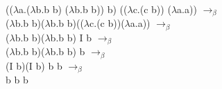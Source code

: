 \documentclass[12pt]{article}
\begin{document}
    (($\lambda$a.($\lambda$b.b b) ($\lambda$b.b b)) b) (($\lambda$c.(c b)) ($\lambda$a.a)) $\rightarrow_{\beta}$\\
    ($\lambda$b.b b)($\lambda$b.b b)(($\lambda$c.(c b))($\lambda$a.a)) $\rightarrow_{\beta}$\\
    ($\lambda$b.b b)($\lambda$b.b b) I b $\rightarrow_{\beta}$\\
    ($\lambda$b.b b)($\lambda$b.b b) b $\rightarrow_{\beta}$\\
    (I b)(I b) b b $\rightarrow_{\beta}$\\
    b b b
    
    
\end{document}
